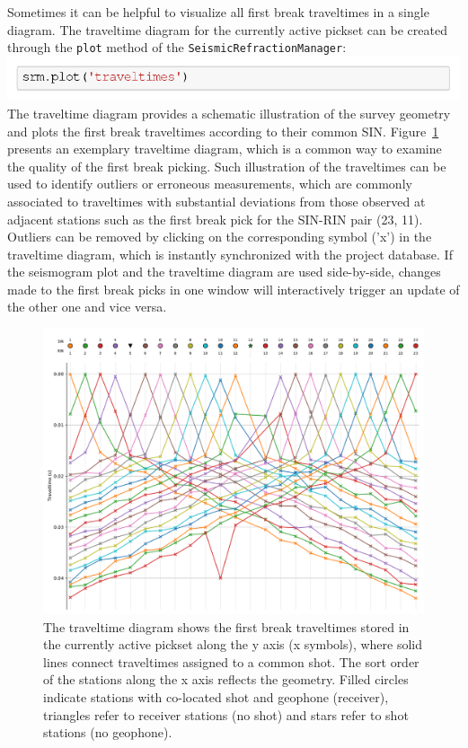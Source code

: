 \documentclass[a4paper,fleqn]{cas-sc}
\begin{document}
Sometimes it can be helpful to visualize all first break traveltimes in a single diagram. The traveltime diagram for the currently active pickset can be created through the \texttt{plot} method of the \texttt{SeismicRefractionManager}:
\newline
\includegraphics[width=.5\textwidth]{./figures/plot_traveltimes.pdf}
\newline
The traveltime diagram provides a schematic illustration of the survey geometry and plots the first break traveltimes according to their common SIN.
Figure~\ref{fig:traveltimes_intro} presents an exemplary traveltime diagram, which is a common way to examine the quality of the first break picking. Such illustration of the traveltimes can be used to identify outliers or erroneous measurements, which are commonly associated to traveltimes with substantial deviations from those observed at adjacent stations such as the first break pick for the SIN-RIN pair (23, 11). Outliers can be removed by clicking on the corresponding symbol ('x') in the traveltime diagram, which is instantly synchronized with the project database. If the seismogram plot and the traveltime diagram are used side-by-side, changes made to the first break picks in one window will interactively trigger an update of the other one and vice versa.

\begin{figure}
	\centering
	\includegraphics[width=.75\textwidth]{figures/traveltimes_intro.pdf}
	\caption{The traveltime diagram shows the first break traveltimes stored in the currently active pickset along the y axis (x symbols), where solid lines connect traveltimes assigned to a common shot. The sort order of the stations along the x axis reflects the geometry. Filled circles indicate stations with co-located shot and geophone (receiver), triangles refer to receiver stations (no shot) and stars refer to shot stations (no geophone).}
	\label{fig:traveltimes_intro}
\end{figure}
\end{document}
